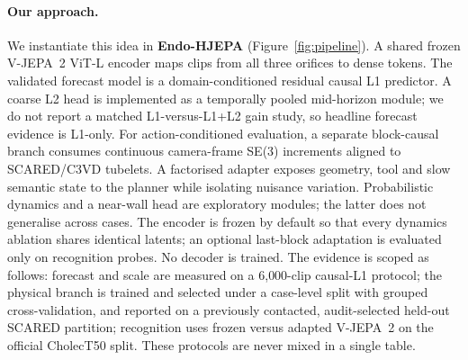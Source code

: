 \documentclass[preprint,12pt]{elsarticle}
\begin{document}
\paragraph{Our approach.}
We instantiate this idea in \textbf{Endo-HJEPA} (Figure~\ref{fig:pipeline}).
A shared frozen V-JEPA~2 ViT-L encoder maps clips from all three orifices to dense tokens.
The validated forecast model is a domain-conditioned residual causal L1
predictor. A coarse L2 head is implemented as a temporally pooled mid-horizon
module; we do not report a matched L1-versus-L1+L2 gain study, so headline
forecast evidence is L1-only.
For action-conditioned evaluation, a separate block-causal branch consumes
continuous camera-frame SE(3) increments aligned to SCARED/C3VD tubelets. A
factorised adapter exposes geometry, tool and slow semantic state to the
planner while isolating nuisance variation. Probabilistic dynamics and a
near-wall head are exploratory modules; the latter does not generalise across
cases.
The encoder is frozen by default so that every dynamics ablation shares identical latents; an optional last-block adaptation is evaluated only on recognition probes.
No decoder is trained.
The evidence is scoped as follows: forecast and scale are measured on a
6{,}000-clip causal-L1 protocol; the physical branch is trained and selected
under a case-level split with grouped cross-validation, and reported on a
previously contacted, audit-selected held-out SCARED partition; recognition uses frozen versus adapted V-JEPA~2 on the
official CholecT50 split.
These protocols are never mixed in a single table.
\end{document}
